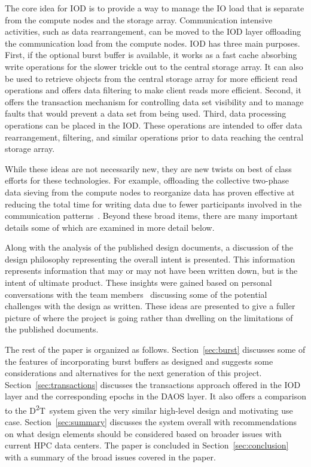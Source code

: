 \documentclass[conference]{IEEEtran}
\newcommand{\DDT}{D\textsuperscript{2}T~}
\begin{document}
The core idea for IOD is to provide a way to manage the IO load that is
separate from the compute nodes and the storage array. Communication intensive
activities, such as data rearrangement, can be moved to the IOD layer
offloading the communication load from the compute nodes. IOD has three main
purposes. First, if the optional burst buffer is available, it works as a fast
cache absorbing write operations for the slower trickle out to the central
storage array. It can also be used to retrieve objects from the central storage
array for more efficient read operations and offers data filtering to make
client reads more efficient.  Second, it offers the transaction mechanism for
controlling data set visibility and to manage faults that would prevent a data
set from being used. Third, data processing operations can be placed in the
IOD. These operations are intended to offer data rearrangement, filtering, and
similar operations prior to data reaching the central storage array.

While these ideas are not necessarily new, they are new twists on best of class
efforts for these technologies. For example, offloading the collective
two-phase data sieving from the compute nodes to reorganize data has proven
effective at reducing the total time for writing data due to fewer participants
involved in the communication patterns~\cite{lofstead:2011:nessie-staging}.
Beyond these broad items, there are many important details some of which are
examined in more detail below.

Along with the analysis of the published design documents, a discussion of the
design philosophy representing the overall intent is presented. This
information represents information that may or may not have been written down,
but is the intent of ultimate product. These insights were gained based on
personal conversations with the team
members~\cite{JohnBent,QuinceyKoziol,EricBarton} discussing some of the
potential challenges with the design as written. These ideas are presented to
give a fuller picture of where the project is going rather than dwelling on the
limitations of the published documents.

The rest of the paper is organized as follows. Section~\ref{sec:burst}
discusses some of the features of incorporating burst buffers as designed and
suggests some considerations and alternatives for the next generation of this
project. Section~\ref{sec:transactions} discusses the transactions approach
offered in the IOD layer and the corresponding epochs in the DAOS layer. It
also offers a comparison to the \DDT system given the very similar high-level
design and motivating use case.  Section~\ref{sec:summary} discusses the system
overall with recommendations on what design elements should be considered based
on broader issues with current HPC data centers. The paper is concluded in
Section~\ref{sec:conclusion} with a summary of the broad issues covered in the
paper.
\end{document}

